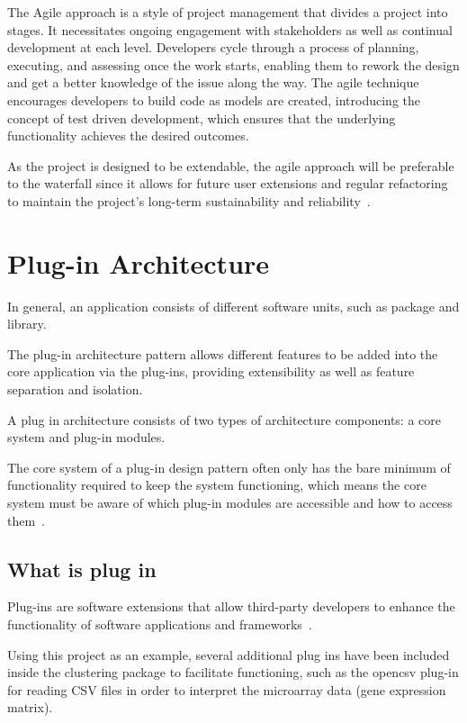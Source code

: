 \documentclass[]{final_report}
\begin{document}
The Agile approach is a style of project management that divides a project into stages. It necessitates ongoing engagement with stakeholders as well as continual development at each level.
Developers cycle through a process of planning, executing, and assessing once the work starts, enabling them to rework the design and get a better knowledge of the issue along the way.
The agile technique encourages developers to build code as models are created, introducing the concept of test driven development, which ensures that the underlying functionality achieves the desired outcomes.

As the project is designed to be extendable, the agile approach will be preferable to the waterfall since it allows for future user extensions and regular refactoring to maintain the project's long-term sustainability and reliability~\cite{pfleeger2006software}.


\section{Plug-in Architecture}
In general, an application consists of different software units, such as package and library.

The plug-in architecture pattern allows different features to be added into the core application via the plug-ins, providing extensibility as well as feature separation and isolation.

A plug in architecture consists of two types of architecture components: a core system and plug-in modules. 

The core system of a plug-in design pattern often only has the bare minimum of functionality required to keep the system functioning, which means the core system must be aware of which plug-in modules are accessible and how to access them~\cite{richards2015software}.

\subsection{What is plug in}
Plug-ins are software extensions that allow third-party developers to enhance the functionality of software applications and frameworks~\cite{dsouza2012expert}.

Using this project as an example, several additional plug ins have been included inside the clustering package to facilitate functioning, such as the opencsv plug-in for reading CSV files in order to interpret the microarray data (gene expression matrix).
\end{document}
